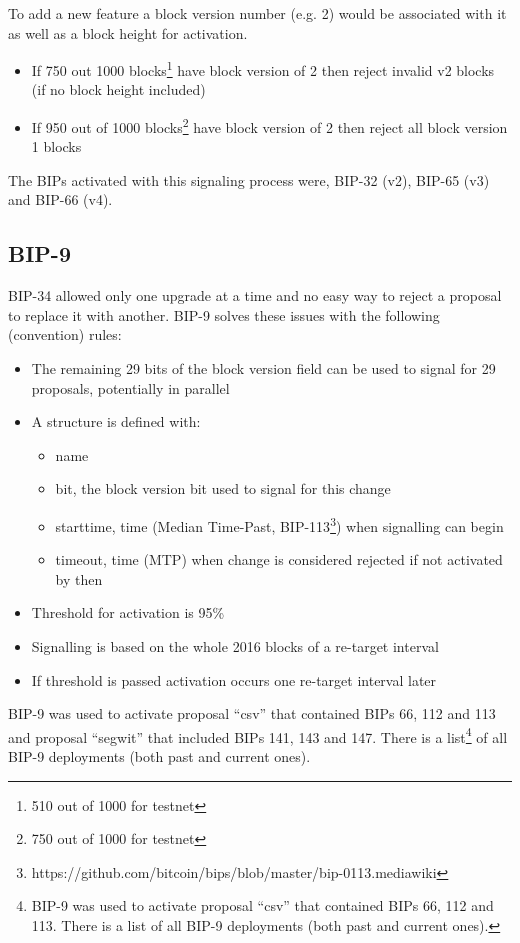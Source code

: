 To add a new feature a block version number (e.g. 2) would be associated with it as well as a block height for activation.

\begin{itemize}
\item If 750 out 1000 blocks\footnote{510 out of 1000 for testnet} have block version of 2 then reject invalid v2 blocks (if no block height included)
\item If 950 out of 1000 blocks\footnote{750 out of 1000 for testnet} have block version of 2 then reject all block version 1 blocks
\end{itemize}

The BIPs activated with this signaling process were, BIP-32 (v2), BIP-65 (v3) and BIP-66 (v4).


\subsection*{BIP-9}
BIP-34 allowed only one upgrade at a time and no easy way to reject a proposal to replace it with another. BIP-9 solves these issues with the following (convention) rules:

\begin{itemize}
\item The remaining 29 bits of the block version field can be used to signal for 29 proposals, potentially in parallel
\item A structure is defined with:
	\begin{itemize}
	\item name
	\item bit, the block version bit used to signal for this change
	\item starttime, time (Median Time-Past, BIP-113\footnote{https://github.com/bitcoin/bips/blob/master/bip-0113.mediawiki}) when signalling can begin
	\item timeout, time (MTP) when change is considered rejected if not activated by then
	\end{itemize}
\item Threshold for activation is 95\%
\item Signalling is based on the whole 2016 blocks of a re-target interval
\item If threshold is passed activation occurs one re-target interval later
\end{itemize}

BIP-9 was used to activate proposal ``csv'' that contained BIPs 66, 112 and 113 and proposal ``segwit'' that included BIPs 141, 143 and 147. There is a list\footnote{BIP-9 was used to activate proposal “csv” that contained BIPs 66, 112 and 113. There is a list of all BIP-9 deployments (both past and current ones).} of all BIP-9 deployments (both past and current ones).

